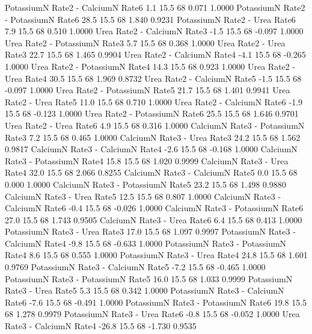 \documentclass[a4paper,12pt]{article}
\begin{document}
\begin{enumerate}[label=\textbf{\alph*})]
\begin{MyVerbatim}
PotassiumN Rate2 - CalciumN Rate6          1.1 15.5 68   0.071  1.0000
PotassiumN Rate2 - PotassiumN Rate6       28.5 15.5 68   1.840  0.9231
PotassiumN Rate2 - Urea Rate6              7.9 15.5 68   0.510  1.0000
Urea       Rate2 - CalciumN Rate3         -1.5 15.5 68  -0.097  1.0000
Urea       Rate2 - PotassiumN Rate3        5.7 15.5 68   0.368  1.0000
Urea       Rate2 - Urea Rate3             22.7 15.5 68   1.465  0.9904
Urea       Rate2 - CalciumN Rate4         -4.1 15.5 68  -0.265  1.0000
Urea       Rate2 - PotassiumN Rate4       14.3 15.5 68   0.923  1.0000
Urea       Rate2 - Urea Rate4             30.5 15.5 68   1.969  0.8732
Urea       Rate2 - CalciumN Rate5         -1.5 15.5 68  -0.097  1.0000
Urea       Rate2 - PotassiumN Rate5       21.7 15.5 68   1.401  0.9941
Urea       Rate2 - Urea Rate5             11.0 15.5 68   0.710  1.0000
Urea       Rate2 - CalciumN Rate6         -1.9 15.5 68  -0.123  1.0000
Urea       Rate2 - PotassiumN Rate6       25.5 15.5 68   1.646  0.9701
Urea       Rate2 - Urea Rate6              4.9 15.5 68   0.316  1.0000
CalciumN   Rate3 - PotassiumN Rate3        7.2 15.5 68   0.465  1.0000
CalciumN   Rate3 - Urea Rate3             24.2 15.5 68   1.562  0.9817
CalciumN   Rate3 - CalciumN Rate4         -2.6 15.5 68  -0.168  1.0000
CalciumN   Rate3 - PotassiumN Rate4       15.8 15.5 68   1.020  0.9999
CalciumN   Rate3 - Urea Rate4             32.0 15.5 68   2.066  0.8255
CalciumN   Rate3 - CalciumN Rate5          0.0 15.5 68   0.000  1.0000
CalciumN   Rate3 - PotassiumN Rate5       23.2 15.5 68   1.498  0.9880
CalciumN   Rate3 - Urea Rate5             12.5 15.5 68   0.807  1.0000
CalciumN   Rate3 - CalciumN Rate6         -0.4 15.5 68  -0.026  1.0000
CalciumN   Rate3 - PotassiumN Rate6       27.0 15.5 68   1.743  0.9505
CalciumN   Rate3 - Urea Rate6              6.4 15.5 68   0.413  1.0000
PotassiumN Rate3 - Urea Rate3             17.0 15.5 68   1.097  0.9997
PotassiumN Rate3 - CalciumN Rate4         -9.8 15.5 68  -0.633  1.0000
PotassiumN Rate3 - PotassiumN Rate4        8.6 15.5 68   0.555  1.0000
PotassiumN Rate3 - Urea Rate4             24.8 15.5 68   1.601  0.9769
PotassiumN Rate3 - CalciumN Rate5         -7.2 15.5 68  -0.465  1.0000
PotassiumN Rate3 - PotassiumN Rate5       16.0 15.5 68   1.033  0.9999
PotassiumN Rate3 - Urea Rate5              5.3 15.5 68   0.342  1.0000
PotassiumN Rate3 - CalciumN Rate6         -7.6 15.5 68  -0.491  1.0000
PotassiumN Rate3 - PotassiumN Rate6       19.8 15.5 68   1.278  0.9979
PotassiumN Rate3 - Urea Rate6             -0.8 15.5 68  -0.052  1.0000
Urea       Rate3 - CalciumN Rate4        -26.8 15.5 68  -1.730  0.9535

\end{MyVerbatim}
\end{enumerate}
\end{document}
